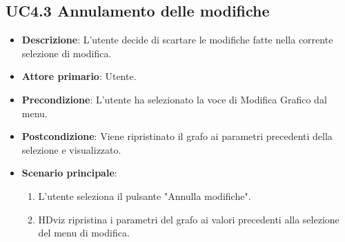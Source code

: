\subsection{UC4.3 Annulamento delle modifiche}

\begin{itemize}
    \item \textbf{Descrizione}: L'utente decide di scartare le modifiche fatte nella corrente selezione di modifica.

    \item \textbf{Attore primario}: Utente.
    
    \item \textbf{Precondizione}:   L'utente ha selezionato la voce di Modifica Grafico dal menu.
    \item \textbf{Postcondizione}:  Viene ripristinato il grafo ai parametri precedenti della selezione e visualizzato.

	\item \textbf{Scenario principale}:
        \begin{enumerate}

            \item L'utente seleziona il pulsante "Annulla modifiche".
            \item HDviz ripristina i parametri del grafo ai valori precedenti alla selezione del menu di modifica.
        
        \end{enumerate}
\end{itemize}



